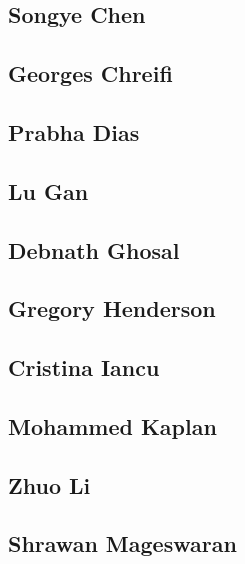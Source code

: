 \documentclass[]{tufte-book}
\begin{document}
\hypertarget{songye_chen}{\subsection{Songye Chen}\label{songye_chen}}

\hypertarget{georges_chreifi}{\subsection{Georges
Chreifi}\label{georges_chreifi}}

\hypertarget{prabha_dias}{\subsection{Prabha Dias}\label{prabha_dias}}

\hypertarget{lu_gan}{\subsection{Lu Gan}\label{lu_gan}}

\hypertarget{debnath_ghosal}{\subsection{Debnath
Ghosal}\label{debnath_ghosal}}

\hypertarget{gregory_henderson}{\subsection{Gregory
Henderson}\label{gregory_henderson}}

\hypertarget{cristina_iancu}{\subsection{Cristina
Iancu}\label{cristina_iancu}}

\hypertarget{mohammed_kaplan}{\subsection{Mohammed
Kaplan}\label{mohammed_kaplan}}

\hypertarget{zhuo_li}{\subsection{Zhuo Li}\label{zhuo_li}}

\hypertarget{shrawan_mageswaran}{\subsection{Shrawan
Mageswaran}\label{shrawan_mageswaran}}
\end{document}
